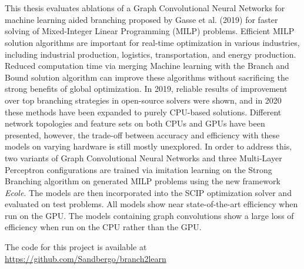 \chapter*{\englishabstractname}
%
This thesis evaluates ablations of a Graph Convolutional Neural Networks for machine learning aided branching proposed by Gasse et al. (2019)
for faster solving of Mixed-Integer Linear Programming (\gls{MILP}) problems. 
Efficient \gls{MILP} solution algorithms are important for real-time optimization in various industries, including industrial production, logistics, transportation, and energy production.  Reduced computation time via merging Machine learning with the Branch and Bound solution algorithm can improve these algorithms without sacrificing the strong benefits of global optimization.
In 2019, reliable results of improvement over top branching strategies in open-source solvers were shown, and in 2020 these methods have been expanded to purely \gls{CPU}-based solutions. Different network topologies and feature sets on both \gls{CPU}s and \gls{GPU}s have been presented, however, the trade-off between accuracy and efficiency with these models on varying hardware is still mostly unexplored.
In order to address this, two variants of Graph Convolutional Neural Networks and three Multi-Layer Perceptron configurations are trained via imitation learning on the Strong Branching algorithm on generated \gls{MILP} problems using the new framework \textit{\gls{Ecole}}.  The models are then incorporated into the \gls{SCIP} optimization solver and evaluated on test problems. All models show near state-of-the-art efficiency when run on the \gls{GPU}. The models containing graph convolutions show a large loss of efficiency when run on the \gls{CPU} rather than the \gls{GPU}.

The code for this project is available at\\ \url{https://github.com/Sandbergo/branch2learn}

%
\clearpage
